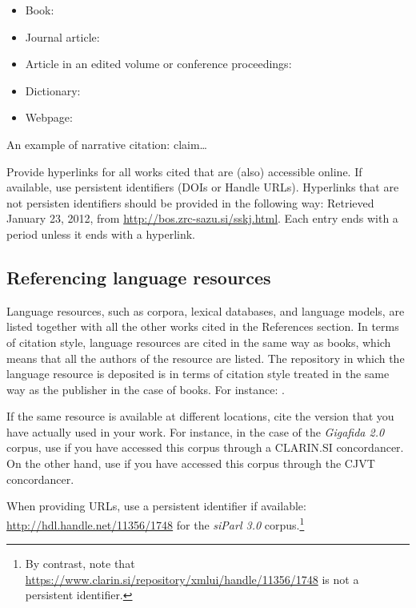 \documentclass{article}
\begin{document}
    \begin{itemize}
        \item Book: \cite{biber1998corpus, studije2005korpusnem}
        \item Journal article: \cite{biber1996investigating, erjavec-infotheca}
        \item Article in an edited volume or conference proceedings: \cite{leech1992corpora, erjavec-multext}
        \item Dictionary: \cite{sinclair1987collins, sskj}
        \item Webpage: \cite{openwebspider, creativecommons, scott2008wordsmith, tei}
    \end{itemize}

An example of narrative citation:  claim\ldots

Provide hyperlinks for all works cited that are (also) accessible online. If available, use persistent identifiers (DOIs or Handle URLs). Hyperlinks that are not persisten identifiers should be provided in the following way: Retrieved January 23, 2012, from \url{http://bos.zrc-sazu.si/sskj.html}. Each entry ends with a period unless it ends with a hyperlink. 

\subsection{Referencing language resources} 
Language resources, such as corpora, lexical databases, and language models, are listed together with all the other works cited in the References section. In terms of citation style, language resources are cited in the same way as books, which means that all the authors of the resource are listed. The repository in which the language resource is deposited is in terms of citation style treated in the same way as the publisher in the case of books. For instance: \cite{parliamentaryCorpus}. 

If the same resource is available at different locations, cite the version that you have actually used in your work. For instance, in the case of the \textit{Gigafida 2.0} corpus, use \cite{gigafida-clarin} if you have accessed this corpus through a CLARIN.SI concordancer. On the other hand, use \cite{gigafida-cjvt} if you have accessed this corpus through the CJVT concordancer.

When providing URLs, use a persistent identifier if available: \url{http://hdl.handle.net/11356/1748} for the \textit{siParl 3.0} \cite{parliamentaryCorpus} corpus.\footnote{By contrast, note that \url{https://www.clarin.si/repository/xmlui/handle/11356/1748} is not a persistent identifier.}
\end{document}

